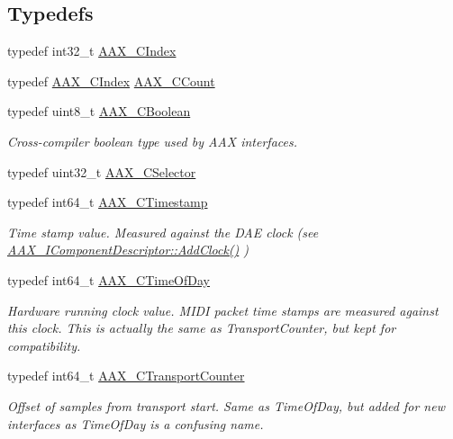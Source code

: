 \subsection*{Typedefs}
\begin{DoxyCompactItemize}
\item 
typedef int32\+\_\+t \mbox{\hyperlink{a00392_a24ac375fa55ccadbc3126e6d81146c28}{A\+A\+X\+\_\+\+C\+Index}}
\item 
typedef \mbox{\hyperlink{a00392_a24ac375fa55ccadbc3126e6d81146c28}{A\+A\+X\+\_\+\+C\+Index}} \mbox{\hyperlink{a00392_a9a9a14ab1486fa8c6734b96976be3056}{A\+A\+X\+\_\+\+C\+Count}}
\item 
typedef uint8\+\_\+t \mbox{\hyperlink{a00392_aa216506530f1d19a2965931ced2b274b}{A\+A\+X\+\_\+\+C\+Boolean}}
\begin{DoxyCompactList}\small\item\em Cross-\/compiler boolean type used by A\+AX interfaces. \end{DoxyCompactList}\item 
typedef uint32\+\_\+t \mbox{\hyperlink{a00392_aeaf9b387f902c50a8360ff423f4a1f23}{A\+A\+X\+\_\+\+C\+Selector}}
\item 
typedef int64\+\_\+t \mbox{\hyperlink{a00392_aae7325dbfa53a983f208a68cb563fba5}{A\+A\+X\+\_\+\+C\+Timestamp}}
\begin{DoxyCompactList}\small\item\em Time stamp value. Measured against the D\+AE clock (see \mbox{\hyperlink{a01781_a59727dee1043fcd7f14da130ab254445}{A\+A\+X\+\_\+\+I\+Component\+Descriptor\+::\+Add\+Clock()}} ) \end{DoxyCompactList}\item 
typedef int64\+\_\+t \mbox{\hyperlink{a00392_a46542a1dcccdcc3b4260a9926edf8a2a}{A\+A\+X\+\_\+\+C\+Time\+Of\+Day}}
\begin{DoxyCompactList}\small\item\em Hardware running clock value. M\+I\+DI packet time stamps are measured against this clock. This is actually the same as Transport\+Counter, but kept for compatibility. \end{DoxyCompactList}\item 
typedef int64\+\_\+t \mbox{\hyperlink{a00392_ac09cd6857748cc296ac0f8bcc20dc74b}{A\+A\+X\+\_\+\+C\+Transport\+Counter}}
\begin{DoxyCompactList}\small\item\em Offset of samples from transport start. Same as Time\+Of\+Day, but added for new interfaces as Time\+Of\+Day is a confusing name. \end{DoxyCompactList}\item 

\end{DoxyCompactItemize}
